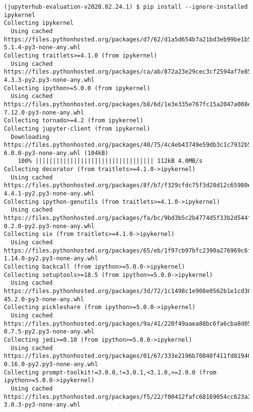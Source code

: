 \documentclass[11pt,a4paper]{article}
\begin{document}
\begin{verbatim}
(jupyterhub-evaluation-v2020.02.24.1) $ pip install --ignore-installed ipykernel
Collecting ipykernel
  Using cached https://files.pythonhosted.org/packages/d7/62/d1a5d654b7a21bd3eb99be1b59a608cc18a7a08ed88495457a87c40a0495/ipykernel-5.1.4-py3-none-any.whl
Collecting traitlets>=4.1.0 (from ipykernel)
  Using cached https://files.pythonhosted.org/packages/ca/ab/872a23e29cec3cf2594af7e857f18b687ad21039c1f9b922fac5b9b142d5/traitlets-4.3.3-py2.py3-none-any.whl
Collecting ipython>=5.0.0 (from ipykernel)
  Using cached https://files.pythonhosted.org/packages/b8/6d/1e3e335e767fc15a2047a008e27df31aa8bcf11c6f3805d03abefc69aa88/ipython-7.12.0-py3-none-any.whl
Collecting tornado>=4.2 (from ipykernel)
Collecting jupyter-client (from ipykernel)
  Downloading https://files.pythonhosted.org/packages/40/75/4c4eb43749e59db3c1c7932b50eaf8c4b8219b1b5644fe379ea796f8dbe5/jupyter_client-6.0.0-py3-none-any.whl (104kB)
    100% |||||||||||||||||||||||||||||||||| 112kB 4.0MB/s
Collecting decorator (from traitlets>=4.1.0->ipykernel)
  Using cached https://files.pythonhosted.org/packages/8f/b7/f329cfdc75f3d28d12c65980e4469e2fa373f1953f5df6e370e84ea2e875/decorator-4.4.1-py2.py3-none-any.whl
Collecting ipython-genutils (from traitlets>=4.1.0->ipykernel)
  Using cached https://files.pythonhosted.org/packages/fa/bc/9bd3b5c2b4774d5f33b2d544f1460be9df7df2fe42f352135381c347c69a/ipython_genutils-0.2.0-py2.py3-none-any.whl
Collecting six (from traitlets>=4.1.0->ipykernel)
  Using cached https://files.pythonhosted.org/packages/65/eb/1f97cb97bfc2390a276969c6fae16075da282f5058082d4cb10c6c5c1dba/six-1.14.0-py2.py3-none-any.whl
Collecting backcall (from ipython>=5.0.0->ipykernel)
Collecting setuptools>=18.5 (from ipython>=5.0.0->ipykernel)
  Using cached https://files.pythonhosted.org/packages/3d/72/1c1498c1e908e0562b1e1cd30012580baa7d33b5b0ffdbeb5fde2462cc71/setuptools-45.2.0-py3-none-any.whl
Collecting pickleshare (from ipython>=5.0.0->ipykernel)
  Using cached https://files.pythonhosted.org/packages/9a/41/220f49aaea88bc6fa6cba8d05ecf24676326156c23b991e80b3f2fc24c77/pickleshare-0.7.5-py2.py3-none-any.whl
Collecting jedi>=0.10 (from ipython>=5.0.0->ipykernel)
  Using cached https://files.pythonhosted.org/packages/01/67/333e2196b70840f411fd819407b4e98aa3150c2bd24c52154a451f912ef2/jedi-0.16.0-py2.py3-none-any.whl
Collecting prompt-toolkit!=3.0.0,!=3.0.1,<3.1.0,>=2.0.0 (from ipython>=5.0.0->ipykernel)
  Using cached https://files.pythonhosted.org/packages/f5/22/f00412fafc68169054cc623a35c32773f22b403ddbe516c8adfdecf25341/prompt_toolkit-3.0.3-py3-none-any.whl

\end{verbatim}
\end{document}
